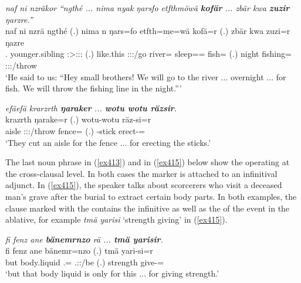 \begin{exe}
	\ex \emph{naf ni nzräkor ``ngthé ... nima nyak ŋarsfo etfthmöwä \textbf{kofär} ... zbär kwa \textbf{zuzir} ŋarzre.''}\\
	\gll naf ni nzrä ngthé (.) nima n ŋars=fo etfth=me=wä kofä=r (.) zbär kwa zuzi=r ŋazre\\
	\Tsg.\Erg{} \Fnsg{} younger.sibling \Stsg:\Sbj>\Fpl:\Obj:\Irr:\Pfv{} (.) {like.this} \Fpl:\Sbj:\Nonpast:\Ipfv/go river=\All{} sleep=\Ins=\Emph{} fish=\Purp{} (.) night \Fut{} fishing=\Purp{} \Fpl:\Sbj:\Nonpast:\Ipfv/throw\\ 
	\trans `He said to us: ``Hey small brothers! We will go to the river ... overnight ... for fish. We will throw the fishing line in the night.'''
	\label{ex414}
\end{exe}
\begin{exe}
	\ex \emph{efäefä krarzrth \textbf{ŋaraker} ... \textbf{wotu wotu räzsir}.}\\
	 krazrth ŋarake=r (.) wotu-wotu räz-si=r\\
	aisle \Stpl:\Sbj:\Irr:\Ipfv/throw fence=\Purp{} (.) \Redup-stick erect-\Nmlz=\Purp\\
	\trans `They cut an aisle for the fence ... for erecting the sticks.'\\
	\label{ex413}
\end{exe}	
	
The last noun phrase in (\ref{ex413}) and in (\ref{ex415}) below show the   operating at the cross-clausal level. In both cases the   marker is attached to an infinitival adjunct. In (\ref{ex415}), the speaker talks about scorcerers who visit a deceased man's grave after the burial to extract certain body parts. In both examples, the clause marked with the  contains the infinitive as well as the  of the event in the ablative, for example \emph{tmä yarisi} `strength giving' in (\ref{ex415}).
	
\begin{exe}
	\ex \emph{fi fenz ane \textbf{bänemrnzo} rä ... \textbf{tmä yarisir}.}\\
	\gll fi fenz ane bänemr=nzo  (.) tmä yari-si=r\\
	but body.liquid \Dem{} \Recog.\Purp=\Only{} \Tsg.\F:\Nonpast:\Ipfv/be (.) strength give-\Nmlz=\Purp{}\\
	\trans `but that body liquid is only for this ... for giving strength.'\\
	\label{ex415}
\end{exe}

